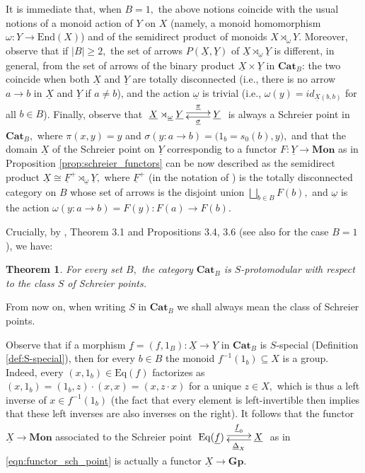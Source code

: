 \documentclass[11pt]{amsart}
\theoremstyle{plain}
\newtheorem{theorem}[subsubsection]{Theorem}
\theoremstyle{definition}
\theoremstyle{remark}
\newcommand{\un}{\underline}
\begin{document}
It is immediate that, when $B=1,$ the above notions coincide with the usual notions of a monoid action of $Y$ on $X$ (namely, a monoid homomorphism $\omega\colon Y\rightarrow\mathrm{End}(X)$) and of the semidirect product of monoids $X\rtimes_{\omega}Y.$ Moreover, observe that if $|B|\geq 2,$ the set of arrows $P(\un{X},\un{Y})$ of $\un{X}\rtimes_{\un{\omega}}\un{Y}$ is different, in general, from the set of arrows of the binary product $\un{X}\times\un{Y}$ in $\mathbf{Cat}_B$: the two coincide  when both $\un{X}$ and $\un{Y}$ are totally disconnected (i.e., there is no arrow $a\rightarrow b$ in $\un{X}$ and $\un{Y}$ if $a\neq b$), and the action $\un{\omega}$ is trivial (i.e., $\omega(y)=id_{\un{X}(b,b)}$ for all $b\in B$). Finally, observe that $\xymatrix{{\un{X}\rtimes_{\un{\omega}}\un{Y}} \ar@<.5ex>[r]^-{\un{\pi}} &{\un{Y}} \ar@<.5ex>[l]^-{\un{\sigma}}}$ is always a Schreier point in $\mathbf{Cat}_B,$ where $\pi(x,y)=y$ and $\sigma(y\colon a\rightarrow b)=\big(1_b=s_0(b),y\big),$ and that the domain $\un{X}$ of the Schreier point on $\un{Y}$ correspondig to a functor $F\colon\un{Y}\rightarrow\mathbf{Mon}$ as in Proposition \ref{prop:schreier_functors} can be now described as the semidirect product $\un{X}\cong \un{F}^+\rtimes_{\un{\omega}}\un{Y},$ where $\un{F}^+$ (in the notation of \cite{cocat, golasinski, hoff}) is the totally disconnected category on $B$ whose set of arrows is the disjoint union $\bigsqcup_{b\in B}F(b),$ and $\un{\omega}$ is the action $\omega(y\colon a\rightarrow b)=F(y)\colon F(a)\rightarrow F(b).$

Crucially, by \cite{mal'tsev-reflection}, Theorem 3.1 and Propositions 3.4, 3.6 (see also \cite{S-protomodular} for the case $B=1$), we have:
\begin{theorem}
For every set $B,$ the category $\mathbf{Cat}_B$ is $S$-protomodular with respect to the class $S$ of Schreier points.
\end{theorem}
From now on, when writing $S$ in $\mathbf{Cat}_B$ we shall always mean the class of Schreier points.

Observe that if a morphism $\underline{f}=(f,1_B)\colon\underline{X}\rightarrow\underline{Y}$ in $\mathbf{Cat}_B$ is $S$-special (Definition \ref{def:S-special}), then for every $b\in B$ the monoid $f^{-1}(1_b)\subseteq X$ is a group. Indeed, every $(x,1_b)\in\mathrm{Eq}(f)$ factorizes as $(x,1_b)=(1_b,z)\cdot(x,x)=(x,z\cdot x)$ for a unique $z\in X,$ which is thus a left inverse of $x\in f^{-1}(1_b)$ (the fact that every element is left-invertible then implies that these left inverses are also inverses on the right). It follows that the functor $\underline{X}\rightarrow \mathbf{Mon}$ associated to the Schreier point $\xymatrix{{\mathrm{Eq}(\underline{f})} \ar@<.5ex>[r]^-{\underline{f}_0} &{\underline{X}} \ar@<.5ex>[l]^-{\underline{\Delta}_X} }$ as in \eqref{eqn:functor_sch_point} is actually a functor $\underline{X}\rightarrow \mathbf{Gp}.$
\end{document}
